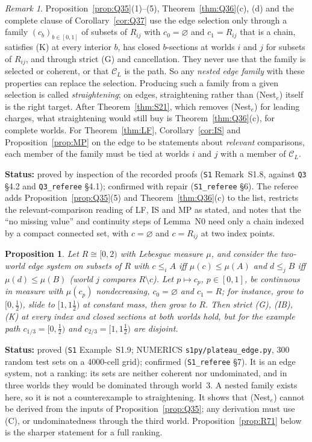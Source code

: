 \documentclass[11pt]{article}
\newtheorem{proposition}[theorem]{Proposition}
\theoremstyle{definition}
\theoremstyle{remark}
\newtheorem{remark}[theorem]{Remark}
\newcommand{\C}{\mathcal C}
\newcommand{\src}[1]{\texttt{#1}}
\newcommand{\status}[1]{\par\smallskip\noindent\textbf{Status:} #1\par\smallskip}
\begin{document}
\begin{remark}\label{rem:straighten}
Proposition~\ref{prop:Q35}(1)--(5), Theorem~\ref{thm:Q36}(c), (d) and the complete clause of Corollary~\ref{cor:Q37} use the edge selection only through a family $(c_b)_{b\in[0,1]}$ of subsets of $R_{ij}$ with $c_0=\varnothing$ and $c_1=R_{ij}$ that is a chain, satisfies (K) at every interior $b$, has closed $b$-sections at worlds $i$ and $j$ for subsets of $R_{ij}$, and through strict (G) and cancellation. They never use that the family is selected or coherent, or that $\C_L$ is the path. So any \emph{nested edge family} with these properties can replace the selection. Producing such a family from a given selection is called \emph{straightening}; on edges, straightening rather than (Nest$_e$) itself is the right target. After Theorem~\ref{thm:S21}, which removes (Nest$_e$) for leading charges, what straightening would still buy is Theorem~\ref{thm:Q36}(c), for complete worlds. For Theorem~\ref{thm:LF}, Corollary~\ref{cor:IS} and Proposition~\ref{prop:MP} on the edge to be statements about \emph{relevant} comparisons, each member of the family must be tied at worlds $i$ and $j$ with a member of $\C_L$.
\end{remark}
\status{proved by inspection of the recorded proofs (\src{S1} Remark~S1.8, against \src{Q3} \S4.2 and \src{Q3\_referee} \S4.1); confirmed with repair (\src{S1\_referee} \S6). The referee adds Proposition~\ref{prop:Q35}(5) and Theorem~\ref{thm:Q36}(c) to the list, restricts the relevant-comparison reading of LF, IS and MP as stated, and notes that the ``no missing value'' and continuity steps of Lemma~N0 need only a chain indexed by a compact connected set, with $c=\varnothing$ and $c=R_{ij}$ at two index points.}

\begin{proposition}\label{prop:plateau}
Let $R\cong[0,2)$ with Lebesgue measure $\mu$, and consider the two-world edge system on subsets of $R$ with $c\le_iA$ iff $\mu(c)\le\mu(A)$ and $d\le_jB$ iff $\mu(d)\le\mu(B)$ (world $j$ compares $R\setminus c$). Let $p\mapsto c_p$, $p\in[0,1]$, be continuous in measure with $\mu(c_p)$ nondecreasing, $c_0=\varnothing$ and $c_1=R$; for instance, grow to $[0,\tfrac12)$, slide to $[1,1\tfrac12)$ at constant mass, then grow to $R$. Then strict (G), (IB), (K) at every index and closed sections at both worlds hold, but for the example path $c_{1/3}=[0,\tfrac12)$ and $c_{2/3}=[1,1\tfrac12)$ are disjoint.
\end{proposition}
\status{proved (\src{S1} Example~S1.9; NUMERICS \src{s1py/plateau\_edge.py}, 300 random test sets on a 4000-cell grid); confirmed (\src{S1\_referee} \S7). It is an edge system, not a ranking: its sets are neither coherent nor undominated, and in three worlds they would be dominated through world~3. A nested family exists here, so it is not a counterexample to straightening. It shows that (Nest$_e$) cannot be derived from the inputs of Proposition~\ref{prop:Q35}; any derivation must use (C), or undominatedness through the third world. Proposition~\ref{prop:R71} below is the sharper statement for a full ranking.}
\end{document}
